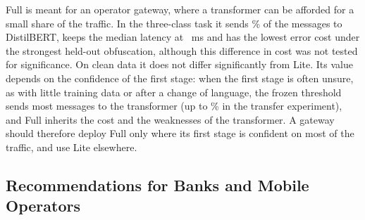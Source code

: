 Full is meant for an operator gateway, where a transformer can be afforded for a small share of the traffic. In the three-class task it sends \% of the messages to DistilBERT, keeps the median latency at ~ms and has the lowest error cost under the strongest held-out obfuscation, although this difference in cost was not tested for significance. On clean data it does not differ significantly from Lite. Its value depends on the confidence of the first stage: when the first stage is often unsure, as with little training data or after a change of language, the frozen threshold sends most messages to the transformer (up to \% in the transfer experiment), and Full inherits the cost and the weaknesses of the transformer. A gateway should therefore deploy Full only where its first stage is confident on most of the traffic, and use Lite elsewhere.

\subsection{Recommendations for Banks and Mobile Operators}\label{sec:recommend}

